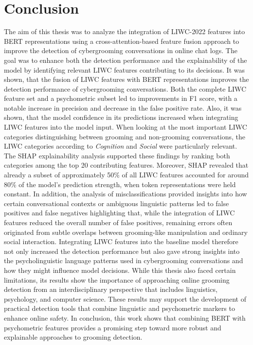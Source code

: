 \chapter{Conclusion}
The aim of this thesis was to analyze the integration of LIWC-2022 features into BERT representations using a cross-attention-based feature fusion approach to improve the detection of cybergrooming conversations in online chat logs. The goal was to enhance both the detection performance and the explainability of the model by identifying relevant LIWC features contributing to its decisions. It was shown, that the fusion of LIWC features with BERT representations improves the detection performance of cybergrooming conversations. Both the complete LIWC feature set and a psychometric subset led to improvements in F1 score, with a notable increase in precision and decrease in the false positive rate. Also, it was shown, that the model confidence in its predictions increased when integrating LIWC features into the model input. When looking at the most important LIWC categories distinguishing between grooming and non-grooming conversations, the LIWC categories according to \textit{Cognition} and \textit{Social} were particularly relevant. The SHAP explainability analysis supported these findings by ranking both categories among the top 20 contributing features. Moreover, SHAP revealed that already a subset of approximately 50\% of all LIWC features accounted for around 80\% of the model’s prediction strength, when token representations were held constant. In addition, the analysis of misclassifications provided insights into how certain conversational contexts or ambiguous linguistic patterns led to false positives and false negatives highlighting that, while the integration of LIWC features reduced the overall number of false positives, remaining errors often originated from subtle overlaps between grooming-like manipulation and ordinary social interaction. Integrating LIWC features into the baseline model therefore not only increased the detection performance but also gave strong insights into the psycholinguistic language patterns used in cybergrooming conversations and how they might influence model decisions. While this thesis also faced certain limitations, its results show the importance of approaching online grooming detection from an interdisciplinary perspective that includes linguistics, psychology, and computer science. These results may support the development of practical detection tools that combine linguistic and psychometric markers to enhance online safety. In conclusion, this work shows that combining BERT with psychometric features provides a promising step toward more robust and explainable approaches to grooming detection. 